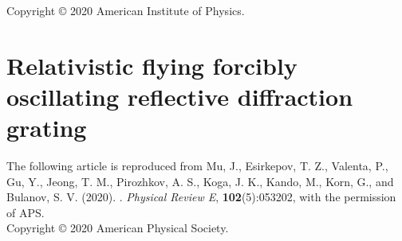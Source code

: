 \documentclass[10pt, a4paper, twoside, openright]{report}
\newcommand{\link}[3][blue]{\href{#2}{\color{#1}{#3}}}%
\begin{document}
\noindent Copyright {\copyright} {2020} {American Institute of Physics}.

\newpage
\mbox{}
\thispagestyle{empty}

\newpage


\section{Relativistic flying forcibly oscillating reflective diffraction grating\label{sec:paper_4}}

The following article is reproduced from Mu, J., Esirkepov, T. Z., Valenta, P., Gu, Y., Jeong, T. M., Pirozhkov, A. S., Koga, J. K., Kando, M., Korn, G., and Bulanov, S. V. (2020). \link{https://doi.org/10.1103/PhysRevE.102.053202}{Relativistic flying forcibly oscillating reflective diffraction grating}. \textit{Physical Review E}, \textbf{102}(5):053202, with the permission of APS. \\

\noindent Copyright {\copyright} {2020} {American Physical Society}.

\newpage
\mbox{}
\thispagestyle{empty}

\newpage


%

%
\end{document}
